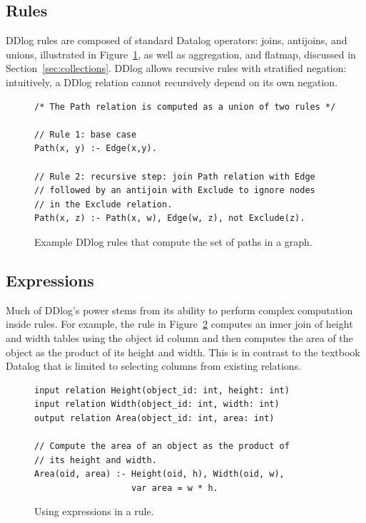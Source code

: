 \subsection{Rules}

DDlog rules are composed of standard Datalog operators: joins, antijoins, and
unions, illustrated in Figure~\ref{fig:rules}, as
well as aggregation, and flatmap, discussed in Section~\ref{sec:collections}.
DDlog allows recursive rules with stratified negation: intuitively, a DDlog
relation cannot recursively depend on its own negation.

\begin{figure}[t]
  \small
  \begin{lstlisting}[language=ddlog]
/* The Path relation is computed as a union of two rules */

// Rule 1: base case
Path(x, y) :- Edge(x,y).

// Rule 2: recursive step: join Path relation with Edge
// followed by an antijoin with Exclude to ignore nodes
// in the Exclude relation.
Path(x, z) :- Path(x, w), Edge(w, z), not Exclude(z).
  \end{lstlisting}
  \caption{Example DDlog rules that compute the set of paths in a graph.\label{fig:rules}}
\end{figure}

\subsection{Expressions}

Much of DDlog's power stems from its ability to perform complex computation
inside rules.  For example, the rule in Figure~\ref{fig:area} computes
an inner join of height and width tables using the object id column and
then computes the area of the object as the product of its height and width.
This is in contrast to the textbook Datalog that is limited to selecting
columns from existing relations.

\begin{figure}[t]
  \small
  \begin{lstlisting}[language=ddlog]
input relation Height(object_id: int, height: int)
input relation Width(object_id: int, width: int)
output relation Area(object_id: int, area: int)

// Compute the area of an object as the product of
// its height and width.
Area(oid, area) :- Height(oid, h), Width(oid, w),
                   var area = w * h.
  \end{lstlisting}
  \caption{Using expressions in a rule.\label{fig:area}}
\end{figure}

